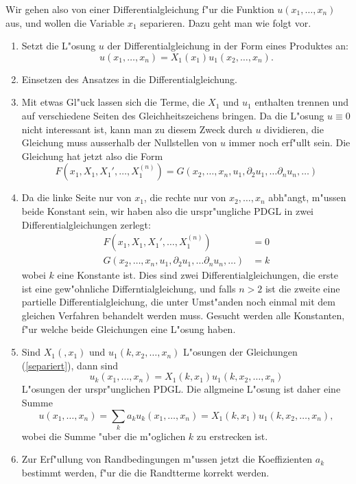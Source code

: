 Wir gehen also von einer Differentialgleichung f"ur die Funktion
$u(x_1,\dots,x_n)$ aus, und wollen die Variable $x_1$ separieren.
Dazu geht man wie folgt vor.
\begin{enumerate}
\item Setzt die L"osung $u$ der Differentialgleichung in der
Form eines Produktes an:
\[
u(x_1,\dots,x_n)=X_1(x_1)u_1(x_2,\dots,x_n).
\]
\item Einsetzen des Ansatzes in die Differentialgleichung.
\item
Mit etwas Gl"uck lassen sich die Terme, die
$X_1$ und $u_1$ enthalten trennen und auf verschiedene Seiten
des Gleichheitszeichens bringen.
Da die L"osung $u\equiv 0$ nicht interessant ist, kann man
zu diesem Zweck durch $u$ dividieren, die Gleichung muss
ausserhalb der Nullstellen von $u$ immer noch erf"ullt sein.
Die Gleichung hat jetzt also die Form
\[
F(x_1,X_1,X_1',\dots,X_1^{(n)})
=
G(x_2,\dots,x_n,u_1,\partial_2u_1,\dots\partial_nu_n,\dots)
\]
\item
Da die linke Seite nur von $x_1$, die rechte nur von $x_2,\dots,x_n$
abh"angt, m"ussen beide Konstant sein, wir haben also die urspr"ungliche
PDGL in zwei Differentialgleichungen zerlegt:
\begin{equation}
\begin{aligned}
F(x_1, X_1,X_1',\dots, X_1^{(n)})&=0\\
G(x_2,\dots,x_n,u_1,\partial_2u_1,\dots\partial_nu_n,\dots)&=k
\end{aligned}
\label{separiert}
\end{equation}
wobei $k$ eine Konstante ist.
Dies sind zwei Differentialgleichungen, die erste ist eine
gew"ohnliche Differntialgleichung, und falls $n>2$ ist die zweite
eine partielle Differentialgleichung, die unter Umst"anden noch
einmal mit dem gleichen Verfahren behandelt werden muss.
Gesucht werden alle Konstanten,
f"ur welche beide Gleichungen eine L"osung haben.
\item Sind $X_1(,x_1)$ und $u_1(k,x_2,\dots,x_n)$ L"osungen der
Gleichungen (\ref{separiert}), dann sind 
\[
u_k(x_1,\dots,x_n)=X_1(k,x_1)u_1(k,x_2,\dots,x_n)
\]
L"osungen der urspr"unglichen PDGL. Die allgmeine L"osung ist daher
eine Summe
\[
u(x_1,\dots,x_n)=
\sum_{k}
a_k
u_k(x_1,\dots,x_n)=X_1(k,x_1)u_1(k,x_2,\dots,x_n),
\]
wobei die Summe "uber die m"oglichen $k$ zu erstrecken ist.
\item
Zur Erf"ullung von Randbedingungen m"ussen jetzt die Koeffizienten
$a_k$ bestimmt werden, f"ur die die Randtterme korrekt werden.
\end{enumerate}
